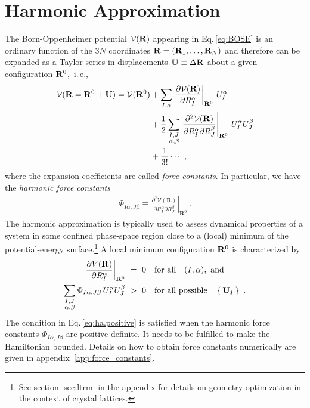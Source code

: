 \section{Harmonic Approximation}
\label{sec:HA}
The Born-Oppenheimer potential $\mathcal V ({\bf R})$ appearing in Eq.\,\eqref{eq:BOSE} is an ordinary function of the $3 N$ coordinates ${\bf R} = ({\bf R}_1, \ldots, {\bf R}_{N})$ and therefore can be expanded as a Taylor series in displacements ${\bf U} \equiv \Delta {\bf R}$ about a given configuration ${\bf R}^0$,~i.\,e.,
\begin{align}
\begin{split}
  \mathcal V ({\bf R} = {\bf R}^0 + {\bf U})
    = \mathcal V ({\bf R}^0)
    &+ \sum_{I, \alpha} 
      \left. \frac{\partial \mathcal V({\bf R})}{\partial R^\alpha_I} 
      \right\vert_{{\bf R}^0}
    \,U^\alpha_I
    \\
    &
    + \frac{1}{2}
    \sum_{\substack{I, J \\ \alpha, \beta}}
    \left.\frac{\partial^{2} \mathcal{V}(\mathbf{R})}{\partial R_{I}^{\alpha} \partial R_{J}^{\beta}}\right|_{\mathbf{R}^{0}}
    \, U_I^\alpha U_J^\beta
    \\
    &+\frac{1}{3!}\cdots ~,
\end{split}
\end{align}
where the expansion coefficients are called \emph{force constants}. In particular, we have the \emph{harmonic force constants}
\begin{align}
  \Phi_{I \alpha, J \beta}
  \equiv \left.\frac{\partial^{2} \mathcal{V}(\mathbf{R})}{\partial R_{I}^{\alpha} \partial R_{J}^{\beta}}\right|_{\mathbf{R}^{0}}~.
  \label{eq:FC2}
\end{align}
The harmonic approximation is typically used to assess dynamical properties of a system in some confined phase-space region close to a (local) minimum of the potential-energy surface.\footnote{See section \ref{sec:ltrm} in the appendix for details on geometry optimization in the context of crystal lattices.} A local minimum configuration ${\bf R}^0$ is characterized by
\begin{align}
	\left. \frac{\partial V({\bf R})}{\partial R^\alpha_I} 
	\right\vert_{{\bf R}^0} 
		&~=~ 0 \quad\text{for all}\quad (I, \alpha),~\text{and} \\
	\sum_{\substack{I, J \\ \alpha, \beta}}
	\Phi_{I \alpha, J \beta}
	\, U_I^\alpha U_J^\beta
		&~>~ 0 \quad\text{for all possible}\quad \set{{\bf U}_I}~.
	\label{eq:ha.positive}
\end{align}
The condition in Eq.\,\eqref{eq:ha.positive} is satisfied when the harmonic force constants $\Phi_{I \alpha, J \beta}$ are positive-definite. It needs to be fulfilled to make the Hamiltonian bounded. Details on how to obtain force constants numerically are given in appendix~\ref{app:force_constants}.

